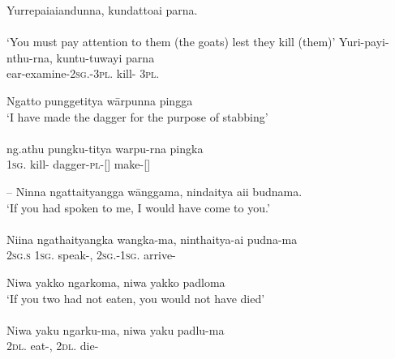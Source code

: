 \documentclass{langscibook}
\begin{document}
\begin{xlist}
\ea\label{ex:5:26}
Yurrepaiaiandunna,                           kundattoai             parna. \\
\citep[18]{teichelmann_outlines_1840} \\
\glt `You must pay attention to them (the goats) lest they kill (them)'
\gll Yuri-payi-nthu-rna,     		kuntu-tuwayi	  parna\\
ear-examine-2\textsc{sg}.-3\textsc{pl}.	kill-	  3\textsc{pl}.\\
\z


\ea\label{ex:5:27}
Ngatto       punggetitya     wārpunna               pingga \\
\glt `I have made the dagger for the purpose of stabbing' \\
\citep[20]{teichelmann_outlines_1840} \\
\gll ng.athu    pungku-titya	warpu-rna	 pingka  \\
   1\textsc{sg}.     kill-  	dagger-\textsc{pl}-[]   make-[]                              \\
\z




--
\ea\label{ex:5:28}
Ninna  ngattaityangga  wānggama,          nindaitya aii            budnama.  \\
\glt  ‘If you had spoken to me, I would have come to you.’ \\
\citep[19]{teichelmann_outlines_1840} \\
\gll Niina   ngathaityangka   wangka-ma,         ninthaitya-ai\footnotemark{}             pudna-ma \\
2\textsc{sg}.\textsc{s}    1\textsc{sg}.	           speak-,      2\textsc{sg}.-1\textsc{sg}.     arrive-                               \\
\z


\ea\label{ex:5:29}
Niwa        yakko   ngarkoma,     niwa         yakko      padloma \\
\glt `If you two had not eaten,   you would not have died' \\
\citep[67]{teichelmann_outlines_1840} \\
\gll Niwa          yaku   ngarku-ma,    niwa          yaku     padlu-ma \\
    2\textsc{dl}.       eat-,    2\textsc{dl}.      die-\\
\z





\end{xlist}
\end{document}

